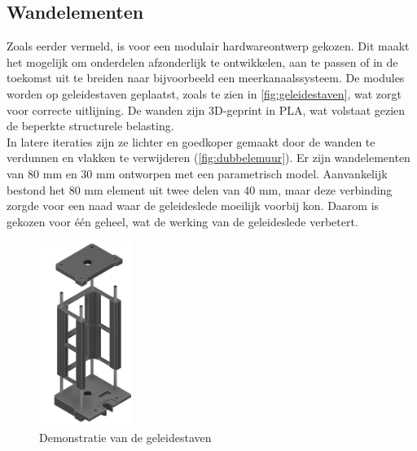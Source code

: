 \subsection{Wandelementen}
Zoals eerder vermeld, is voor een modulair hardwareontwerp gekozen. Dit maakt het mogelijk om onderdelen afzonderlijk te ontwikkelen, aan te passen of in de toekomst uit te breiden naar bijvoorbeeld een meerkanaalssysteem. De modules worden op geleidestaven geplaatst, zoals te zien in \autoref{fig:geleidestaven}, wat zorgt voor correcte uitlijning.
De wanden zijn 3D-geprint in PLA, wat volstaat gezien de beperkte structurele belasting. 
\\[12pt]In latere iteraties zijn ze lichter en goedkoper gemaakt door de wanden te verdunnen en vlakken te verwijderen (\autoref{fig:dubbelemuur}). Er zijn wandelementen van 80 mm en 30 mm ontworpen met een parametrisch model. Aanvankelijk bestond het 80 mm element uit twee delen van 40 mm, maar deze verbinding zorgde voor een naad waar de geleideslede moeilijk voorbij kon. Daarom is gekozen voor één geheel, wat de werking van de geleideslede verbetert.
\\[12pt]\begin{minipage}[t]{0.49\textwidth}
    \vspace{0pt}
    \begin{figure}[H]
        \centering
        \captionsetup{width=1\textwidth} %
        \includegraphics[height=6cm]{figures/GuidesDemonstration_2.png}
        \caption{Demonstratie van de geleidestaven}\label{fig:geleidestaven}
    \end{figure}
\end{minipage}
